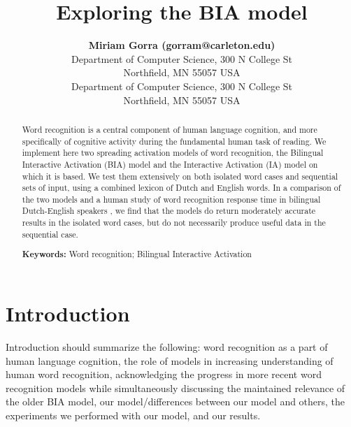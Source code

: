 \documentclass[10pt,letterpaper]{article}
\title{Exploring the BIA model}
\author{{\large \bf Miriam Gorra (gorram@carleton.edu)} \\
Department of Computer Science, 300 N College St \\
Northfield, MN 55057 USA
\AND {\large \bf William Maxon Bremer (bremerw@carleton.edu)} \\
Department of Computer Science, 300 N College St \\
Northfield, MN 55057 USA}
\begin{document}
\maketitle


\begin{abstract}
Word recognition is a central component of human language cognition, and more specifically of cognitive activity during the fundamental human task of reading. We implement here two spreading activation models of word recognition, the Bilingual Interactive Activation (BIA) model and the Interactive Activation (IA) model on which it is based. We test them extensively on both isolated word cases and sequential sets of input, using a combined lexicon of Dutch and English words. In a comparison of the two models and a human study of word recognition response time in bilingual Dutch-English speakers \cite{DijkstraVanHeuven1998a}, we find that the models do return moderately accurate results in the isolated word cases, but do not necessarily produce useful data in the sequential case.



\textbf{Keywords:}
Word recognition; Bilingual Interactive Activation
\end{abstract}


\section{Introduction}

Introduction should summarize the following: word recognition as a part of human language cognition, the role of models in increasing understanding of human word recognition, acknowledging the progress in more recent word recognition models while simultaneously discussing the maintained relevance of the older BIA model, our model/differences between our model and others, the experiments we performed with our model, and our results.
\end{document}
